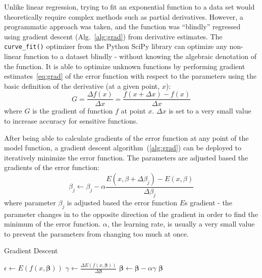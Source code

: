 \documentclass[12pt]{mcmthesis}
\begin{document}
    Unlike linear regression, trying to fit an exponential function to a data set would theoretically require complex methods such as partial derivatives.
    However, a programmatic approach was taken, and the function was ``blindly'' regressed using gradient descent (Alg.~\ref{alg:grad}) from derivative estimates.
    The \verb|curve_fit()| optimizer from the Python SciPy library can optimize any non-linear function to a dataset blindly - without knowing the algebraic denotation of the function.
    It is able to optimize unknown functions by performing gradient estimates~\eqref{eq:grad} of the error function with respect to the parameters using the basic definition of the derivative (at a given point, $x$):
%
    \begin{equation}
        G = \frac{\Delta f(x)}{\Delta x} = \frac{f(x + \Delta x) - f(x)}{\Delta x}
        \label{eq:grad}
    \end{equation}
%
    \noindent where $G$ is the gradient of function $f$ at point $x$.
    $\Delta x$ is set to a very small value to increase accuracy for sensitive functions.

    After being able to calculate gradients of the error function at any point of the model function, a gradient descent algorithm~(\ref{alg:grad}) can be deployed to iteratively minimize the error function.
    The parameters are adjusted based the gradients of the error function:
%
    \begin{equation}
        \beta_j \longleftarrow \beta_j - \alpha \frac{E(x, \beta + \Delta \beta_j) - E(x, \beta)}{\Delta \beta_j}
    \end{equation}
%
    \noindent where parameter $\beta_j$ is adjusted based the error function $E$\textquotesingle s gradient - the parameter changes in to the opposite direction of the gradient in order to find the minimum of the error function.
    $\alpha$, the learning rate, is usually a very small value to prevent the parameters from changing too much at once.

    \begin{algorithm}
        \caption{Gradient Descent}
        \label{alg:grad}
        \begin{algorithmic}
            \Repeat
                \State $\epsilon \gets E(f(x, \mathbf{\beta}))$  
                \State $\gamma \gets \frac{\Delta E(f(x, \mathbf{\beta}))}{\Delta \mathbf{\beta}}$  
                \State $\mathbf{\beta} \gets \mathbf{\beta} - \alpha \gamma$  
            \State \Return $\mathbf{\beta}$ 
        \end{algorithmic}
    \end{algorithm}
\end{document}

